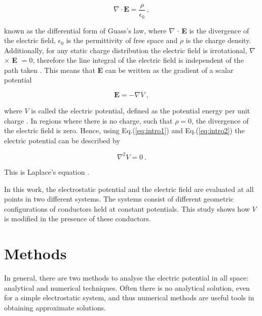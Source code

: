 \documentclass[a4paper]{jpconf}
\begin{document}
\begin{equation}
\textbf{$\nabla$} \cdot \textbf{E} = \frac{\rho}{\epsilon_0}~,
\label{eq:intro1}
\end{equation} 

\noindent known as the differential form of Guass's law, where \textbf{$\nabla$} $\cdot$ \textbf{E} is the divergence of the electric field, $\epsilon_0$ is the permittivity of free space and $\rho$ is the charge density. Additionally, for any static charge distribution the electric field is irrotational, \textbf{$\nabla$} $\times$ \textbf{E} $= 0$, therefore the line integral of the electric field
is independent of the path taken \cite{griffiths-introElec}. This means that \textbf{E} can be written as the gradient of a scalar potential 

\begin{equation}
\textbf{E} = - \nabla V~,
\label{eq:intro2}
\end{equation} 

\noindent where $V$ is called the electric potential, defined as the potential energy per unit charge  \cite{Sears.Zamansky-uniPhy}.
In regions where there is no charge, such that $\rho = 0$, the divergence of the electric field is zero. Hence, using Eq.(\ref{eq:intro1}) and Eq.(\ref{eq:intro2}) the electric potential
can be described by

\begin{equation}
\nabla^2 V = 0~.
\label{eq:intro3}
\end{equation} 

\noindent This is Laplace's equation \cite{RHB-MathematicalMethods}.\\ \par
In this work, the electrostatic potential and the electric field are evaluated at all points in two different systems. The systems consist of different geometric configurations of conductors held at constant potentials. This study shows how $V$ is modified in the presence of these conductors. 

\section*{Methods}
In general, there are two methods to analyse the electric potential in all space: analytical and numerical techniques. Often there is no analytical solution, even for a simple electrostatic system, and thus numerical methods are useful tools in obtaining approximate solutions. 
\end{document}
